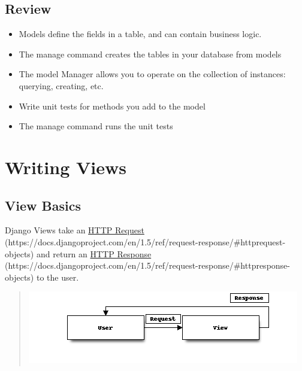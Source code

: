 \documentclass[letterpaper,10pt,english]{sphinxmanual}
\begin{document}
\section{Review}
\label{tutorial/models:review}\begin{itemize}
\item {} 
Models define the fields in a table, and can contain business logic.

\item {} 
The  manage command creates the tables in your database from
models

\item {} 
The model Manager allows you to operate on the collection of
instances: querying, creating, etc.

\item {} 
Write unit tests for methods you add to the model

\item {} 
The  manage command runs the unit tests

\end{itemize}


\chapter{Writing Views}
\label{tutorial/views:writing-views}\label{tutorial/views::doc}\label{tutorial/views:model-meta}

\section{View Basics}
\label{tutorial/views:view-basics}
Django Views take an \href{https://docs.djangoproject.com/en/1.5/ref/request-response/\#httprequest-objects}{HTTP Request} (https://docs.djangoproject.com/en/1.5/ref/request-response/\#httprequest-objects) and return an \href{https://docs.djangoproject.com/en/1.5/ref/request-response/\#httpresponse-objects}{HTTP Response} (https://docs.djangoproject.com/en/1.5/ref/request-response/\#httpresponse-objects) to
the user.
\begin{quote}

\includegraphics{blockdiag-0cbbf8b8e1d96bb23a053d6006b8e38e409e9312.png}
\end{quote}
\end{document}
